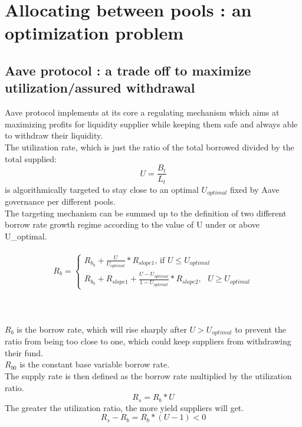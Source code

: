 \documentclass[conference]{IEEEtran}
\begin{document}
\section{Allocating between pools : an optimization problem}
\subsection{Aave protocol : a trade off to maximize utilization/assured withdrawal }
Aave protocol implements at its core a regulating mechanism which aims at maximizing profits for liquidity supplier while keeping them safe and always able to withdraw their liquidity.\\
The utilization rate, which is just the ratio of the total borrowed divided by the total supplied:
\begin{equation}
U = \frac{B_t}{L_t}
\end{equation}
is algorithmically targeted to stay close to an optimal $U_{optimal}$ fixed by Aave governance per different pools. \\
The targeting mechanism can be summed up to the definition of two different borrow rate growth regime according to the value of U under or above U_{optimal}.\\\\
$$
R_b=\left\{
\begin{array}{ll}
  R_{b_0} + \frac{U}{U_{optimal}} * R_{slope1}\text{, if } U \le U_{optimal}\\
  R_{b_0}+ R_{slope1} + \frac{U-U_{optimal}}{1-U_{optimal}} * R_{slope2}, \text{ } U\ge U_{optimal} 
\end{array}
\right.
$$\\\\\\
$R_b$ is the borrow rate, which will rise sharply after $U>U_{optimal}$ to prevent the ratio from being too close to one, which could keep suppliers from withdrawing their fund.\\
$R_{b0}$ is the constant base variable borrow rate.\\
The supply rate is then defined as the borrow rate multiplied by the utilization ratio.
\begin{equation}
R_s = R_b * U
\end{equation}
The greater the utilization ratio, the more yield suppliers will get. 
\begin{equation}
R_s - R_b = R_b * (U-1) <0
\end{equation}
\end{document}
